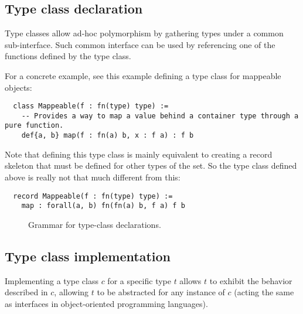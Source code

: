 \subsection{Type class declaration}\label{subsec:zilch-grammar-declarations-typeclass}

Type classes allow ad-hoc polymorphism by gathering types under a common sub-interface.
Such common interface can be used by referencing one of the functions defined by the type class.

For a concrete example, see this example defining a type class for mappeable objects:

\noindent\begin{verbatim}
  class Mappeable(f : fn(type) type) :=
    -- Provides a way to map a value behind a container type through a pure function.
    def{a, b} map(f : fn(a) b, x : f a) : f b
\end{verbatim}
\vspace*{\baselineskip}

Note that defining this type class is mainly equivalent to creating a record skeleton that must be defined for other types of the set.
So the type class defined above is really not that much different from this:

\noindent\begin{verbatim}
  record Mappeable(f : fn(type) type) :=
    map : forall(a, b) fn(fn(a) b, f a) f b
\end{verbatim}

\begin{figure}[H]
  \centering


  \caption{Grammar for type-class declarations.}
  \label{fig:zilch-grammar-declarations-typeclass-grammar}
\end{figure}

\subsection{Type class implementation}\label{subsec:zilch-grammar-declarations-implementation}

Implementing a type class $c$ for a specific type $t$ allows $t$ to exhibit the behavior described in $c$, allowing $t$ to be abstracted for any instance of $c$ (acting the same as interfaces in object-oriented programming languages).

